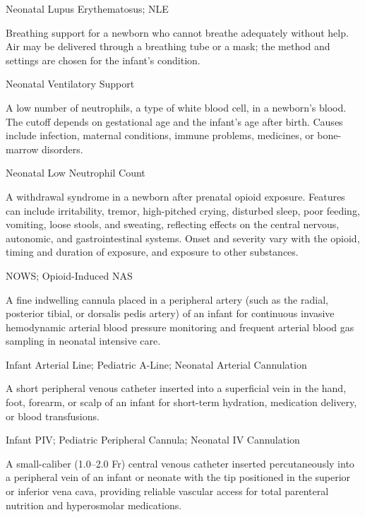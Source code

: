 \synonyms
Neonatal Lupus Erythematosus; NLE

 Breathing support for a newborn who cannot breathe adequately without help. Air may be delivered through a breathing tube or a mask; the method and settings are chosen for the infant's condition.

\synonyms
Neonatal Ventilatory Support

 A low number of neutrophils, a type of white blood cell, in a newborn's blood. The cutoff depends on gestational age and the infant's age after birth. Causes include infection, maternal conditions, immune problems, medicines, or bone-marrow disorders.

\synonyms
Neonatal Low Neutrophil Count

 A withdrawal syndrome in a newborn after prenatal opioid exposure. Features can include irritability, tremor, high-pitched crying, disturbed sleep, poor feeding, vomiting, loose stools, and sweating, reflecting effects on the central nervous, autonomic, and gastrointestinal systems. Onset and severity vary with the opioid, timing and duration of exposure, and exposure to other substances.

\synonyms
NOWS; Opioid-Induced NAS

 A fine indwelling cannula placed in a peripheral artery (such as the radial, posterior tibial, or dorsalis pedis artery) of an infant for continuous invasive hemodynamic arterial blood pressure monitoring and frequent arterial blood gas sampling in neonatal intensive care.

\synonyms
Infant Arterial Line; Pediatric A-Line; Neonatal Arterial Cannulation

 A short peripheral venous catheter inserted into a superficial vein in the hand, foot, forearm, or scalp of an infant for short-term hydration, medication delivery, or blood transfusions.

\synonyms
Infant PIV; Pediatric Peripheral Cannula; Neonatal IV Cannulation

 A small-caliber (1.0--2.0 Fr) central venous catheter inserted percutaneously into a peripheral vein of an infant or neonate with the tip positioned in the superior or inferior vena cava, providing reliable vascular access for total parenteral nutrition and hyperosmolar medications.

